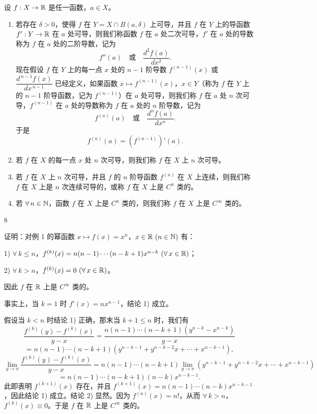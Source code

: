 \begin{mydef*}{}

	设 \(f:X\to\mathbb{R}\) 是任一函数，\(a\in X\)。

	\begin{enumerate}[label=\arabic*)]
		\item 若存在 \(\delta>0\)，使得 \(f\) 在 \(Y=X\cap B(a,\delta)\) 上可导，并且 \(f\) 在 \(Y\) 上的导函数 \(f':Y\to\mathbb{R}\) 在 \(a\) 处可导，则我们称函数 \(f\) 在 \(a\) 处二次可导，\(f'\) 在 \(a\) 处的导数称为 \(f\) 在 \(a\) 处的二阶导数，记为
		\[
		f''(a)\quad\text{或}\quad\frac{d^2f(a)}{dx^2}.
		\]
		现在假设 \(f\) 在 \(Y\) 上的每一点 \(x\) 处的 \(n-1\) 阶导数 \(f^{(n-1)}(x)\) 或 \(\dfrac{d^{\,n-1}f(x)}{dx^{\,n-1}}\) 已经定义，如果函数 \(x\longmapsto f^{(n-1)}(x)\)，\(x\in Y\)（称为 \(f\) 在 \(Y\) 上的 \(n-1\) 阶导函数，记为 \(f^{(n-1)}\)）在 \(a\) 处可导，则我们称 \(f\) 在 \(a\) 处 \(n\) 次可导，\(f^{(n-1)}\) 在 \(a\) 处的导数称为 \(f\) 在 \(a\) 处的 \(n\) 阶导数，记为
		\[
		f^{(n)}(a)\quad\text{或}\quad\frac{d^nf(a)}{dx^n}.
		\]
		于是
		\[
		f^{(n)}(a)=(f^{(n-1)})'(a).
		\]

		\item 若 \(f\) 在 \(X\) 的每一点 \(x\) 处 \(n\) 次可导，则我们称 \(f\) 在 \(X\) 上 \(n\) 次可导。

		\item 若 \(f\) 在 \(X\) 上 \(n\) 次可导，并且 \(f\) 的 \(n\) 阶导函数 \(f^{(n)}\) 在 \(X\) 上连续，则我们称 \(f\) 在 \(X\) 上是 \(n\) 次连续可导的，或称 \(f\) 在 \(X\) 上是 \(C^n\) 类的。

		\item 若 \(\forall\,n\in\mathbb{N}\)，函数 \(f\) 在 \(X\) 上是 \(C^n\) 类的，则我们称 \(f\) 在 \(X\) 上是 \(C^\infty\) 类的。
	\end{enumerate}

\end{mydef*}

\begin{sourceexample}{8}

	证明：对例 1 的幂函数 \(x\longmapsto f(x)=x^n\)，\(x\in\mathbb{R}\ (n\in\mathbb{N})\) 有：

	1) \(\forall\,k\le n\)，\(f^{(k)}(x)=n(n-1)\cdots(n-k+1)x^{n-k}\ (\forall\,x\in\R)\)；

	2) \(\forall\,k>n\)，\(f^{(k)}(x)=0\ (\forall\,x\in\mathbb{R})\)。

	因此 \(f\) 在 \(\mathbb{R}\) 上是 \(C^\infty\) 类的。

	事实上，当 \(k=1\) 时 \(f'(x)=nx^{n-1}\)，结论 1) 成立。

	假设当 \(k<n\) 时结论 1) 正确，那末当 \(k+1\le n\) 时，我们有
	\[
	\frac{f^{(k)}(y)-f^{(k)}(x)}{y-x}=\frac{n(n-1)\cdots(n-k+1)(y^{n-k}-x^{n-k})}{y-x}
	\]
	\[
	=n(n-1)\cdots(n-k+1)(y^{n-k-1}+y^{n-k-2}x+\cdots+x^{n-k-1}),
	\]
	\[
	\lim_{y\to x}\frac{f^{(k)}(y)-f^{(k)}(x)}{y-x}=n(n-1)\cdots(n-k+1)\lim_{y\to x}(y^{n-k-1}+y^{n-k-2}x+\cdots+x^{n-k-1})
	\]
	\[
	=n(n-1)\cdots(n-k+1)(n-k)x^{n-k-1}.
	\]
	此即表明 \(f^{(k+1)}(x)\) 存在，并且 \(f^{(k+1)}(x)=n(n-1)\cdots(n-k)x^{n-k-1}\)，因此结论 1) 成立。结论 2) 显然。因为 \(f^{(n)}(x)=n!\)，从而 \(\forall\,k>n\)，\(f^{(k)}(x)\equiv0\)。于是 \(f\) 在 \(\mathbb{R}\) 上是 \(C^\infty\) 类的。

\end{sourceexample}

